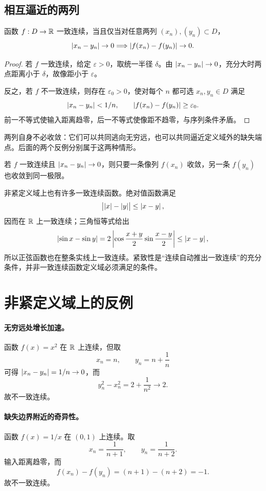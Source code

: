 \subsection{相互逼近的两列}


\begin{theorem}[序列判据]
函数 \(f:D\to\mathbb{R}\) 一致连续，当且仅当对任意两列 \((x_n),(y_n)\subset D\)，
\[
 \left|x_n-y_n\right|\to0
 \Longrightarrow
 \left|f(x_n)-f(y_n)\right|\to0.
\]
\end{theorem}

\begin{proof}
若 \(f\) 一致连续，给定 \(\varepsilon>0\)，取统一半径 \(\delta\)。由 \(\left|x_n-y_n\right|\to0\)，充分大时两点距离小于 \(\delta\)，故像距小于 \(\varepsilon\)。

反之，若 \(f\) 不一致连续，则存在 \(\varepsilon_0>0\)，使对每个 \(n\) 都可选 \(x_n,y_n\in D\) 满足
\[
 \left|x_n-y_n\right|<1/n,\qquad
 \left|f(x_n)-f(y_n)\right|\ge\varepsilon_0.
\]
前一不等式使输入距离趋零，后一不等式使像距不趋零，与序列条件矛盾。
\end{proof}

两列自身不必收敛：它们可以共同逃向无穷远，也可以共同逼近定义域外的缺失端点。后面的两个反例分别属于这两种情形。

\begin{corollary}
若 \(f\) 一致连续且 \(\left|x_n-y_n\right|\to0\)，则只要一条像列 \(f(x_n)\) 收敛，另一条 \(f(y_n)\) 也收敛到同一极限。
\end{corollary}

非紧定义域上也有许多一致连续函数。绝对值函数满足
\[
 \bigl|\left|x\right|-\left|y\right|\bigr|\le\left|x-y\right|,
\]
因而在 \(\mathbb{R}\) 上一致连续；三角恒等式给出
\[
 \left|\sin x-\sin y\right|
 =2\left|\cos\frac{x+y}{2}\sin\frac{x-y}{2}\right|
 \le\left|x-y\right|,
\]
所以正弦函数也在整条实线上一致连续。紧致性是“连续自动推出一致连续”的充分条件，并非一致连续函数定义域必须满足的条件。

\section{非紧定义域上的反例}


\paragraph{无穷远处增长加速。}
函数 \(f(x)=x^2\) 在 \(\mathbb{R}\) 上连续，但取
\[
 x_n=n,\qquad y_n=n+\frac1n
\]
可得 \(\left|x_n-y_n\right|=1/n\to0\)，而
\[
 y_n^2-x_n^2=2+\frac1{n^2}\to2.
\]
故不一致连续。

\paragraph{缺失边界附近的奇异性。}
函数 \(f(x)=1/x\) 在 \((0,1)\) 上连续。取
\[
 x_n=\frac1{n+1},\qquad y_n=\frac1{n+2}.
\]
输入距离趋零，而
\[
 f(x_n)-f(y_n)=(n+1)-(n+2)=-1.
\]
故不一致连续。

